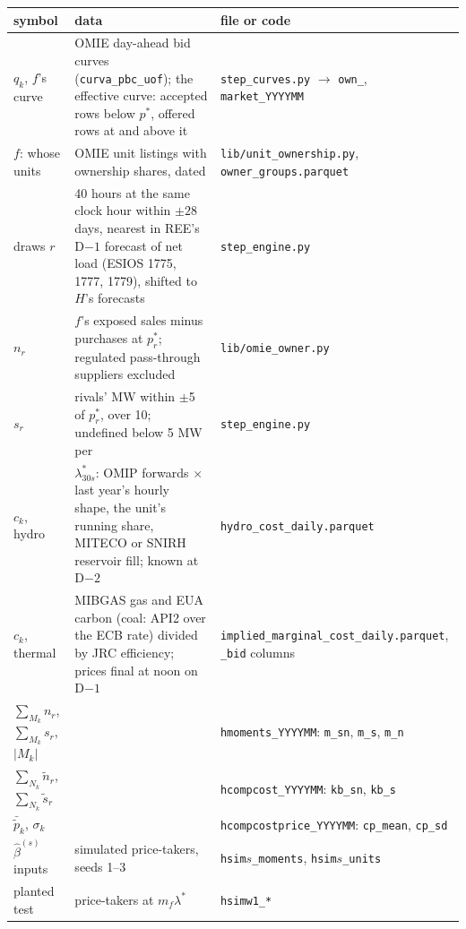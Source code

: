 \documentclass[11pt]{article}
\newcommand{\eur}{\text{\texteuro}}
\newcommand{\code}[1]{\texttt{\small #1}}
\begin{document}
\begin{center}
\small
\begin{tabular}{>{\raggedright}p{2.6cm} >{\raggedright}p{6.4cm} >{\raggedright\arraybackslash}p{5.2cm}}
\toprule
symbol & data & file or code \\
\midrule
$q_k$, $f$'s curve & OMIE day-ahead bid curves (\code{curva\_pbc\_uof}); the effective curve: accepted rows below $p^*$, offered rows at and above it & \code{step\_curves.py} $\to$ \code{own\_}, \code{market\_YYYYMM} \\
$f$: whose units & OMIE unit listings with ownership shares, dated & \code{lib/unit\_ownership.py}, \code{owner\_groups.parquet} \\
draws $r$ & 40 hours at the same clock hour within $\pm 28$ days, nearest in REE's D$-1$ forecast of net load (ESIOS 1775, 1777, 1779), shifted to $H$'s forecasts & \code{step\_engine.py} \\
$n_r$ & $f$'s exposed sales minus purchases at $p_r^*$; regulated pass-through suppliers excluded & \code{lib/omie\_owner.py} \\
$s_r$ & rivals' MW within $\pm$\eur5 of $p_r^*$, over \eur10; undefined below 5 MW per \eur & \code{step\_engine.py} \\
$c_k$, hydro & $\lambda^*_{30s}$: OMIP forwards $\times$ last year's hourly shape, the unit's running share, MITECO or SNIRH reservoir fill; known at D$-2$ & \code{hydro\_cost\_daily.parquet} \\
$c_k$, thermal & MIBGAS gas and EUA carbon (coal: API2 over the ECB rate) divided by JRC efficiency; prices final at noon on D$-1$ & \code{implied\_marginal\_\allowbreak cost\_daily.parquet}, \code{\_bid} columns \\
$\sum_{M_k} n_r$, $\sum_{M_k} s_r$, $\lvert M_k\rvert$ & & \code{hmoments\_YYYYMM}: \code{m\_sn}, \code{m\_s}, \code{m\_n} \\
$\sum_{N_k} \tilde n_r$, $\sum_{N_k} \tilde s_r$ & & \code{hcompcost\_YYYYMM}: \code{kb\_sn}, \code{kb\_s} \\
$\bar{\tilde p}_k$, $\sigma_k$ & & \code{hcompcostprice\_YYYYMM}: \code{cp\_mean}, \code{cp\_sd} \\
$\hat\beta^{(s)}$ inputs & simulated price-takers, seeds 1--3 & \code{hsim}$s$\code{\_moments}, \code{hsim}$s$\code{\_units} \\
planted test & price-takers at $m_f \lambda^*$ & \code{hsimw1\_*} \\
\bottomrule
\end{tabular}
\end{center}
\end{document}
